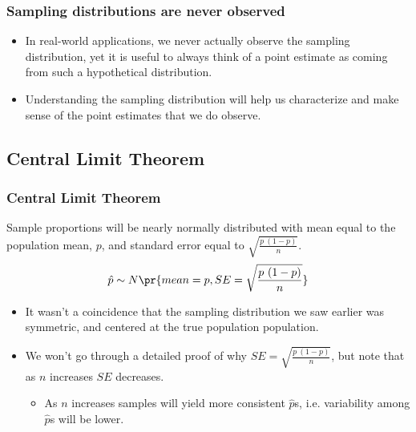 
\begin{frame}
\frametitle{Sampling distributions are never observed}

\begin{itemize}

\item In real-world applications, we never actually observe the sampling distribution, yet it is useful to always think of a point estimate as coming from such a hypothetical distribution.

\item Understanding the sampling distribution will help us characterize and make sense of the point estimates that we do observe.

\end{itemize}

\end{frame}


\subsection{Central Limit Theorem}


\begin{frame}
\frametitle{Central Limit Theorem}

{Sample proportions will be nearly normally distributed with mean equal to the population mean, $p$, and standard error equal to $\sqrt{\frac{p~(1-p)}{n}}$.
\[ \hat{p} \sim N \pr{ mean = p, SE = \sqrt{\frac{p~(1-p)}{n}} } \]
}

\begin{itemize}

\item It wasn't a coincidence that the sampling distribution we saw earlier was symmetric, and centered at the true population population.

\item We won't go through a detailed proof of why $SE =  \sqrt{\frac{p~(1-p)}{n}}$, but note that as $n$ increases $SE$ decreases.
\begin{itemize}
\item As $n$ increases samples will yield more consistent $\hat{p}$s, i.e. variability among $\hat{p}$s will be lower.
\end{itemize}

\end{itemize}

\end{frame}

